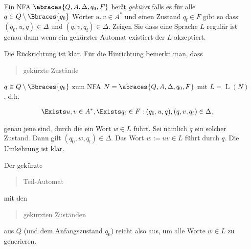 
\begin{exercise}

Ein NFA $\abraces{Q, A, \Delta, q_0, F}$ heißt \textit{gekürzt} falls es für alle $q \in Q \setminus \Bbraces{q_0}$ Wörter $u, v \in A^\ast$ und einen Zustand $q_\mathrm{f} \in F$ gibt so dass $(q_0, u, q) \in \Delta$ und $(q, v, q_\mathrm{f}) \in \Delta$.
Zeigen Sie dass eine Sprache $L$ regulär ist genau dann wenn ein gekürzter Automat existiert der $L$ akzeptiert.

\end{exercise}


\begin{solution}

Die Rückrichtung ist klar.
Für die Hinrichtung bemerkt man, dass \blockquote{gekürzte Zustände} $q \in Q \setminus \Bbraces{q_0}$ zum NFA $N = \abraces{Q, A, \Delta, q_0, F}$ mit $L = \operatorname L(N)$, d.h.

\begin{align*}
    \Exists u, v \in A^\ast, \Exists q_\mathrm{f} \in F:
        (q_0, u, q), (q, v, q_\mathrm{f}) \in \Delta,
\end{align*}

genau jene sind, durch die ein Wort $w \in L$ führt.
Sei nämlich $q$ ein solcher Zustand.
Dann gilt $(q_0, w, q_\mathrm{f}) \in \Delta$.
Das Wort $w := uv \in L$ führt durch $q$.
Die Umkehrung ist klar.

Der gekürzte \blockquote{Teil-Automat} mit den \blockquote{gekürzten Zuständen} aus $Q$ (und dem Anfangszustand $q_0$) reicht also aus, um alle Worte $w \in L$ zu generieren.

\end{solution}

